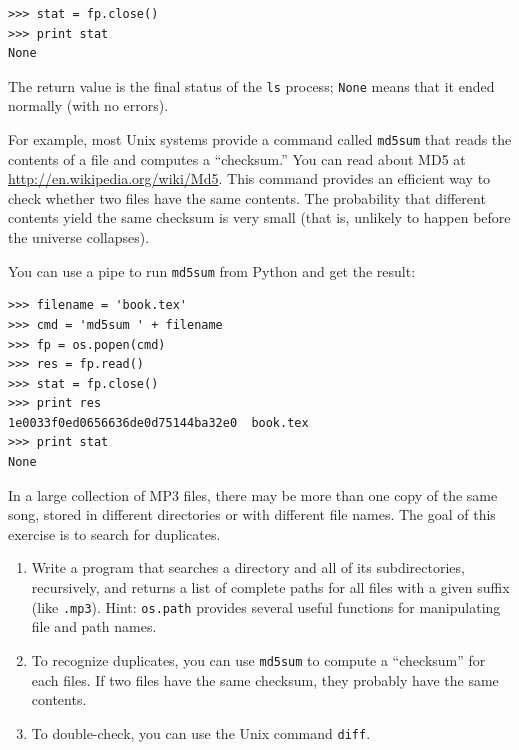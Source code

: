 \documentclass[10pt]{book}
\begin{document}
\begin{CJK}{UTF8}{gbsn}
\begin{verbatim}
>>> stat = fp.close()
>>> print stat
None
\end{verbatim}
%
The return value is the final status of the {\tt ls} process;
{\tt None} means that it ended normally (with no errors).

For example, most Unix systems provide a command called {\tt md5sum}
that reads the contents of a file and computes a ``checksum.''
You can read about MD5 at \url{http://en.wikipedia.org/wiki/Md5}.  This
command provides an efficient way to check whether two files
have the same contents.  The probability that different contents
yield the same checksum is very small (that is, unlikely to happen
before the universe collapses).

You can use a pipe to run {\tt md5sum} from Python and get the result:

\begin{verbatim}
>>> filename = 'book.tex'
>>> cmd = 'md5sum ' + filename
>>> fp = os.popen(cmd)
>>> res = fp.read()
>>> stat = fp.close()
>>> print res
1e0033f0ed0656636de0d75144ba32e0  book.tex
>>> print stat
None
\end{verbatim}


\begin{exercise}
\label{checksum}

In a large collection of MP3 files, there may be more than one
copy of the same song, stored in different directories or with
different file names.  The goal of this exercise is to search for
duplicates.

\begin{enumerate}

\item Write a program that searches a directory and all of its
subdirectories, recursively, and returns a list of complete paths
for all files with a given suffix (like {\tt .mp3}).
Hint: {\tt os.path} provides several useful functions for
manipulating file and path names.

\item To recognize duplicates, you can use {\tt md5sum}
to compute a ``checksum'' for each files.  If two files have
the same checksum, they probably have the same contents.

\item To double-check, you can use the Unix command {\tt diff}.


\end{enumerate}
\end{exercise}
\end{CJK}
\end{document}
